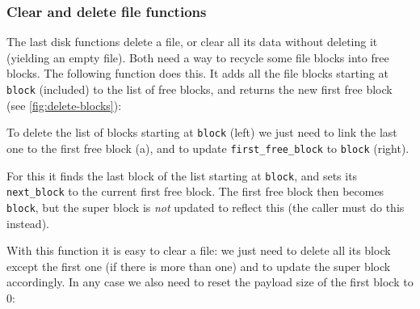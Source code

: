 \subsubsection{Clear and delete file functions}

The last disk functions delete a file, or clear all its data without deleting
it (yielding an empty file). Both need a way to recycle some file blocks into
free blocks. The following function does this. It adds all the file blocks
starting at {\tt block} (included) to the list of free blocks, and returns the
new first free block (see \cref{fig:delete-blocks}):

\begin{Figure}
  

  \caption{To delete the list of blocks starting at {\tt block} (left) we
  just need to link the last one to the first free block (a), and to update
  {\tt first\_free\_block} to {\tt block} (right).}\label{fig:delete-blocks}
\end{Figure}


For this it finds the last block of the list starting at {\tt block}, and sets
its {\tt next\_block} to the current first free block. The first free block
then becomes {\tt block}, but the super block is {\em not} updated to reflect
this (the caller must do this instead).

With this function it is easy to clear a file: we just need to delete all its
block except the first one (if there is more than one) and to update the super
block accordingly. In any case we also need to reset the payload size of the
first block to 0:


